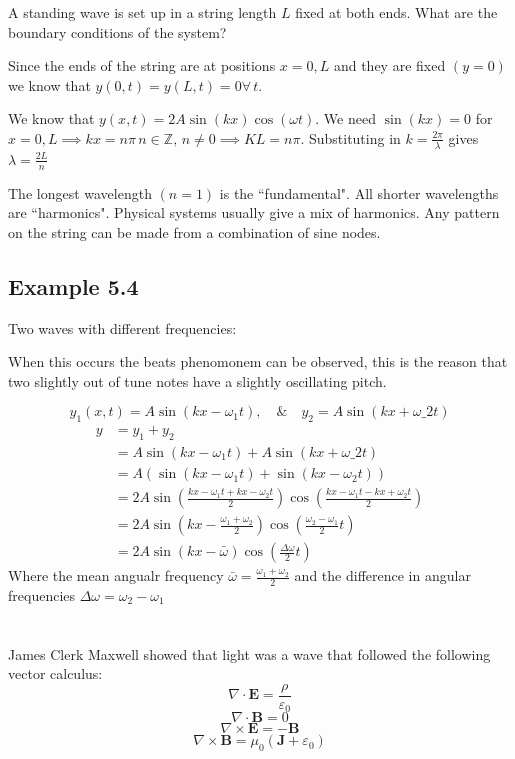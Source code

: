 \documentclass{article}
\renewcommand{\vec}[1]{\bm{#1}}
\newcommand{\vv}[1]{\vec{#1}}
\newcommand{\A}{\forall\,}
\newcommand{\bb}[1]{\mathbb{#1}}
\begin{document}
A standing wave is set up in a string length \(L\) fixed at both ends. What are the boundary conditions of the system?

Since the ends of the string are at positions \(x=0,L\) and they are fixed \((y=0)\) we know that \(y(0,t)=y(L,t)=0\A t\).

We know that \(y(x,t)=2A\sin(kx)\cos(\omega t)\). We need \(\sin(kx)=0\) for \(x=0,L\implies kx=n\pi\, n\in\bb Z,\,n\ne0\implies KL=n\pi\). Substituting in \(k=\frac{2\pi}{\lambda}\) gives \(\lambda=\frac{2L}{n}\)

The longest wavelength \((n=1)\) is the ``fundamental". All shorter wavelengths are ``harmonics". Physical systems usually give a mix of harmonics. Any pattern on the string can be made from a combination of sine nodes.

\subsection*{Example 5.4}

Two waves with different frequencies:

When this occurs the beats phenomonem can be observed, this is the reason that two slightly out of tune notes have a slightly oscillating pitch.

\[y_1(x,t)=A\sin(kx-\omega_1 t),\quad\&\quad y_2=A\sin(kx+\omega \_2t)\]
\begin{align*}
y&=y_1+y_2\\
&=A\sin\left(kx-\omega_1 t\right)+A\sin\left(kx+\omega \_2t\right)\\
&=A(\sin\left(kx-\omega_1t\right)+\sin\left(kx-\omega_2t\right))\\
&=2A\sin\left(\frac{kx-\omega_1t+kx-\omega_2t}{2}\right)\cos\left(\frac{kx-\omega_1t-kx+\omega_2t}{2}\right)\\
&=2A\sin\left(kx-\frac{\omega_1+\omega_2}{2}\right)\cos\left(\frac{\omega_2-\omega_1}{2}t\right)\\
&=2A\sin\left(kx-\bar{\omega}\right)\cos\left(\frac{\Delta \omega}{2}t\right)
\end{align*} 
Where the mean angualr frequency \(\bar\omega=\frac{\omega_1+\omega_2}{2}\) and the difference in angular frequencies \(\Delta\omega=\omega_2-\omega_1\)

\section{}

James Clerk Maxwell showed that light was a wave that followed the following vector calculus:
\[\nabla\cdot\vv E=\frac{\rho}{\varepsilon_0}\]
\[\nabla\cdot\vv B=0\]
\[\nabla\times\vv E=-\vv B\]
\[\nabla\times\vv B=\mu_0(\vv J+\varepsilon_0)\]
\end{document}

